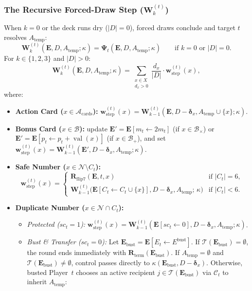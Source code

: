 \documentclass{article}
\theoremstyle{plain}
\theoremstyle{definition}
\theoremstyle{remark}
\DeclareMathOperator{\val}{val}
\begin{document}
\subsubsection{The Recursive Forced-Draw Step ($\mathbf{W}_k^{(t)}$)}
When $k = 0$ or the deck runs dry ($|D| = 0$), forced draws conclude and target $t$ resolves $A_{\text{temp}}$:
\[
    \mathbf{W}_k^{(t)}(\mathbf{E}, D, A_{\text{temp}}; \kappa) = \mathbf{\Psi}_t(\mathbf{E}, D, A_{\text{temp}}; \kappa) \qquad \text{if } k = 0 \text{ or } |D| = 0.
\]
For $k \in \{1, 2, 3\}$ and $|D| > 0$:
\[
    \mathbf{W}_k^{(t)}(\mathbf{E}, D, A_{\text{temp}}; \kappa) = \sum_{\substack{x \in X \\ d_x > 0}} \frac{d_x}{|D|} \cdot \mathbf{w}_{\text{step}}^{(t)}(x),
\]
where:
\begin{itemize}
    \item \textbf{Action Card ($x \in \mathcal{A}_{\text{cards}}$):} $\mathbf{w}_{\text{step}}^{(t)}(x) = \mathbf{W}_{k-1}^{(t)}(\mathbf{E}, D - \boldsymbol{\delta}_x, A_{\text{temp}} \cup \{x\}; \kappa)$.
    \item \textbf{Bonus Card ($x \in \mathcal{B}$):} update $\mathbf{E}' = \mathbf{E}[m_t \leftarrow 2m_t]$ (if $x \in \mathcal{B}_{\times}$) or $\mathbf{E}' = \mathbf{E}[p_t \leftarrow p_t + \val(x)]$ (if $x \in \mathcal{B}_{+}$), and set $\mathbf{w}_{\text{step}}^{(t)}(x) = \mathbf{W}_{k-1}^{(t)}(\mathbf{E}', D - \boldsymbol{\delta}_x, A_{\text{temp}}; \kappa)$.
    \item \textbf{Safe Number ($x \in \mathcal{N} \setminus C_t$):}
    \[
        \mathbf{w}_{\text{step}}^{(t)}(x) =
        \begin{cases}
            \mathbf{R}_{\text{flip7}}(\mathbf{E}, t, x) & \text{if } |C_t| = 6, \\
            \mathbf{W}_{k-1}^{(t)}\big(\mathbf{E}[C_t \leftarrow C_t \cup \{x\}], D - \boldsymbol{\delta}_x, A_{\text{temp}}; \, \kappa\big) & \text{if } |C_t| < 6.
        \end{cases}
    \]
    \item \textbf{Duplicate Number ($x \in \mathcal{N} \cap C_t$):}
    \begin{itemize}
        \item \textit{Protected ($sc_t = 1$):} $\mathbf{w}_{\text{step}}^{(t)}(x) = \mathbf{W}_{k-1}^{(t)}(\mathbf{E}[sc_t \leftarrow 0], D - \boldsymbol{\delta}_x, A_{\text{temp}}; \kappa)$.
        \item \textit{Bust \& Transfer ($sc_t = 0$):} Let $\mathbf{E}_{\text{bust}} = \mathbf{E}[E_t \leftarrow E^{\text{bust}}]$. If $\mathcal{T}(\mathbf{E}_{\text{bust}}) = \emptyset$, the round ends immediately with $\mathbf{R}_{\text{term}}(\mathbf{E}_{\text{bust}})$. If $A_{\text{temp}} = \emptyset$ and $\mathcal{T}(\mathbf{E}_{\text{bust}}) \neq \emptyset$, control passes directly to $\kappa(\mathbf{E}_{\text{bust}}, D - \boldsymbol{\delta}_x)$. Otherwise, busted Player~$t$ chooses an active recipient $j \in \mathcal{T}(\mathbf{E}_{\text{bust}})$ via $\mathcal{C}_t$ to inherit $A_{\text{temp}}$:

\end{itemize}
\end{itemize}
\end{document}
